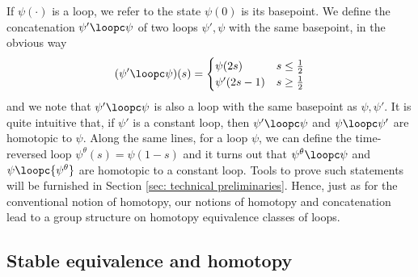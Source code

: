 If $\psi(\cdot)$ is a loop, we refer to the state $\psi(0)$ is its basepoint. We define the concatenation $\psi' \loopc \psi$ of two loops $\psi',\psi$ with the same basepoint, in the obvious way
\begin{equation} \label{eq: concatenation}
	(\psi' \loopc \psi) (s) = \begin{cases} \psi(2s) &  s \leq \tfrac{1}{2}  \\
		\psi'(2s-1) &  s \geq \tfrac{1}{2}  \\
	\end{cases}
\end{equation}
and we note that $\psi' \loopc \psi$ is also a loop with the same basepoint as $\psi,\psi'$.
It is quite intuitive that, if $\psi'$ is a constant loop, then $\psi' \loopc \psi$ and $\psi \loopc \psi'$ are homotopic to $\psi$. Along the same lines, for a loop $\psi$, we can define the time-reversed loop ${\psi^{\theta}}(s)=\psi(1-s)$ and it turns out that ${\psi^{\theta}} \loopc\psi$ and $\psi\loopc{\psi^{\theta}}$ are  homotopic to a constant loop. Tools to prove such statements will be furnished in Section \ref{sec: technical preliminaries}. Hence, just as for the conventional notion of homotopy, our notions of homotopy and concatenation lead to a group structure  on homotopy equivalence classes of loops.  

\subsection{Stable equivalence and homotopy}  \label{sec: stable equivalence and homotopy}
